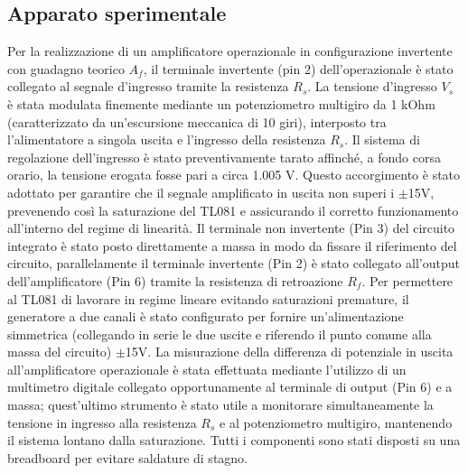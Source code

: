 \documentclass[a4paper, oneside]{article}
\begin{document}
\subsection{Apparato sperimentale}
Per la realizzazione di un amplificatore operazionale in configurazione invertente
con guadagno teorico $A_f$, il terminale invertente (pin 2) dell'operazionale
è stato collegato al segnale d'ingresso tramite la resistenza $R_s$. 
La tensione d'ingresso $V_s$ è stata modulata finemente mediante un
potenziometro multigiro da 1 kOhm (caratterizzato da un'escursione
meccanica di 10 giri), interposto tra l'alimentatore a singola
uscita e l'ingresso della resistenza $R_s$. Il sistema di
regolazione dell'ingresso è stato preventivamente tarato
affinché, a fondo corsa orario, la tensione erogata fosse
pari a circa 1.005 V. Questo accorgimento è stato adottato
per garantire che il segnale amplificato in uscita non
superi i $\pm$15V, prevenendo così la saturazione del TL081
e assicurando il corretto funzionamento all'interno del
regime di linearità. Il terminale non invertente (Pin 3)
del circuito integrato è stato posto direttamente a
massa in modo da fissare il riferimento del circuito,
parallelamente il terminale invertente (Pin 2)
è stato collegato all'output dell'amplificatore (Pin 6)
tramite la resistenza di retroazione $R_f$. Per permettere
al TL081 di lavorare in regime lineare evitando
saturazioni premature, il generatore a due canali
è stato configurato per fornire un'alimentazione simmetrica
(collegando in serie le due uscite e riferendo il punto
comune alla massa del circuito) $\pm$15V. La misurazione
della differenza di potenziale in uscita all'amplificatore
operazionale è stata effettuata mediante l'utilizzo di un
multimetro digitale collegato opportunamente al terminale
di output (Pin 6) e a massa; quest'ultimo strumento è
stato utile a monitorare simultaneamente la tensione
in ingresso alla resistenza $R_s$ e al potenziometro
multigiro, mantenendo il sistema lontano dalla saturazione.
Tutti i componenti sono stati disposti su una breadboard per evitare saldature di stagno.
\end{document}
